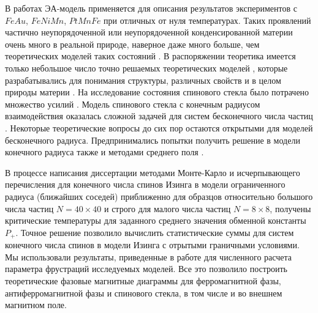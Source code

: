 В работах \cite{Feigelman1985Hierarchical, Murani1977Spin, Deryabin1983Features} ЭА-модель применяется для описания результатов экспериментов с $FeAu$, $FeNiMn$, $PtMnFe$ при отличных от нуля температурах.  Таких проявлений частично неупорядоченной или неупорядоченной конденсированной материи очень много в реальной природе, наверное даже много больше, чем теоретических моделей таких состояний \cite{ziman1979models}. В распоряжении теоретика имеется только небольшое число точно решаемых теоретических моделей \cite{baxter2016exactly}, которые разрабатывались для понимания структуры, различных свойств и в целом природы материи \cite{ziman1979models}. На исследование состояния спинового стекла было потрачено множество усилий \cite{binder1986spin, fischer1993spin, young1998spin, bezzub1983}. Модель спинового стекла с конечным радиусом взаимодействия оказалась сложной задачей для систем бесконечного числа частиц \cite{kor1989}. Некоторые теоретические вопросы до сих пор остаются открытыми для моделей бесконечного радиуса\cite{sherrington1975solvable}. Предпринимались попытки получить решение в модели конечного радиуса также и методами среднего поля \cite{belokon2006, belokon2001funk}. 

В процессе написания диссертации методами Монте-Карло и исчерпывающего перечисления для конечного числа спинов Изинга в модели ограниченного радиуса (ближайших соседей) приближенно для образцов относительно большого числа частиц $N=40\times40$ и строго для малого числа частиц $N=8\times8$, получены критические температуры для заданного среднего значения обменной константы $P_+$. Точное решение позволило вычислить статистические суммы для систем конечного числа спинов в модели Изинга с отрытыми граничными условиями. Мы использовали результаты, приведенные в работе \cite{makarov2019} для численного расчета параметра фрустраций исследуемых моделей. Все это позволило построить теоретические фазовые магнитные диаграммы для ферромагнитной фазы, антиферромагнитной фазы и спинового стекла, в том числе и во внешнем магнитном поле.
